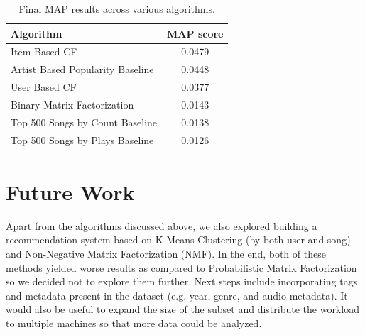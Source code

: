 \documentclass[11pt,preprint]{aastex}
\begin{document}
\begin{table}[h]
\begin{center}
\begin{tabular}{lc}
\hline
\bf{Algorithm} &  \bf{MAP score}\\ \hline
Item Based  CF  &  0.0479 \\ 
Artist Based Popularity Baseline  & 0.0448    \\ 
User Based  CF  &  0.0377 \\ 
Binary Matrix Factorization  &   0.0143  \\ 
Top 500 Songs by Count  Baseline &  0.0138  \\ 
Top 500 Songs by Plays  Baseline &  0.0126  \\ 
\end{tabular}
\caption{Final MAP results across various algorithms.}\label{tab:map}
\end{center}
\end{table}

\section{Future Work}
Apart from the algorithms discussed above, we also explored building a recommendation system based on K-Means Clustering (by both user and song) and Non-Negative Matrix Factorization (NMF). In the end, both of these methods yielded worse results as compared to Probabilistic Matrix Factorization so we decided not to explore them further. Next steps include incorporating tags and metadata present in the dataset (e.g. year, genre, and audio metadata). It would also be useful to expand the size of the subset and distribute the workload to multiple machines so that more data could be analyzed.


\end{document}
